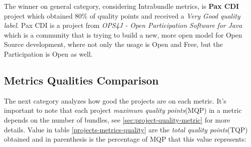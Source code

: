 The winner on general category, considering Intrabundle metrics, is \textbf{Pax CDI} project which obtained 80\% of quality points and received a \emph{Very Good quality label}. Pax CDI is a project from \emph{OPS4J - Open Participation Software for Java} which is a community that is trying to build a new, more open model for Open Source development, where not only the usage is Open and Free, but the Participation is Open as well. 

\subsection{Metrics Qualities Comparison}

The next category analyzes how good the projects are on each metric. It's important to note that each project \emph{maximum quality points}(MQP) in a metric depends on the number of bundles, see \ref{sec:project-quality-metric} for more details. Value in table \ref{projects-metrics-quality} are the \emph{total quality points}(TQP) obtained and in parenthesis is the percentage of MQP that this value represents:  

